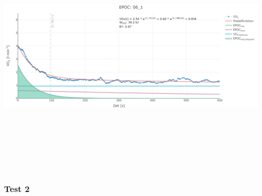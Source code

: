 \documentclass[
  letterpaper,
  DIV=11]{scrartcl}
\begin{document}
\includegraphics[width=11.45833in,height=4.6875in]{images/06_1.png}

\subsubsection{Test 2}
\end{document}
